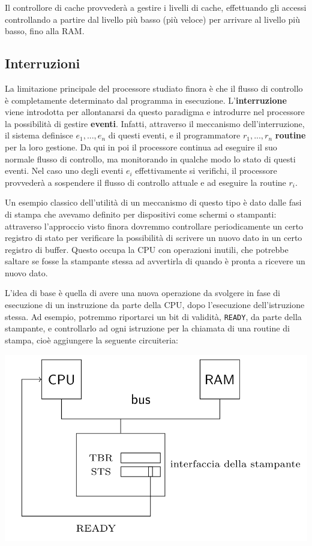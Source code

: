 \documentclass[a4paper,11pt]{article}
\begin{document}
Il controllore di cache provvederà a gestire i livelli di cache, effettuando gli accessi controllando a partire dal livello più basso (più veloce) per arrivare al livello più basso, fino alla RAM.

\subsection{Interruzioni}
La limitazione principale del processore studiato finora è che il flusso di controllo è completamente determinato dal programma in esecuzione.
L'\textbf{interruzione} viene introdotta per allontanarsi da questo paradigma e introdurre nel processore la possibilità di gestire \textbf{eventi}.
Infatti, attraverso il meccanismo dell'interruzione, il sistema definisce $e_1, ..., e_n$ di questi eventi, e il programmatore $r_1, ..., r_n$ \textbf{routine} per la loro gestione.
Da qui in poi il processore continua ad eseguire il suo normale flusso di controllo, ma monitorando in qualche modo lo stato di questi eventi.
Nel caso uno degli eventi $e_i$ effettivamente si verifichi, il processore provvederà a sospendere il flusso di controllo attuale e ad eseguire la routine $r_i$.

Un esempio classico dell'utilità di un meccanismo di questo tipo è dato dalle fasi di stampa che avevamo definito per dispositivi come schermi o stampanti: attraverso l'approccio visto finora dovremmo controllare periodicamente un certo registro di stato per verificare la possibilità di scrivere un nuovo dato in un certo registro di buffer.
Questo occupa la CPU con operazioni inutili, che potrebbe saltare se fosse la stampante stessa ad avvertirla di quando è pronta a ricevere un nuovo dato.

L'idea di base è quella di avere una nuova operazione da svolgere in fase di esecuzione di un instruzione da parte della CPU, dopo l'esecuzione dell'istruzione stessa.
Ad esempio, potremmo riportarci un bit di validità, \lstinline|READY|, da parte della stampante, e controllarlo ad ogni istruzione per la chiamata di una routine di stampa, cioè aggiungere la seguente circuiteria:
\begin{center}
	\includegraphics[scale = 0.4]{../figures/int_1.png}
\end{center}
\end{document}
